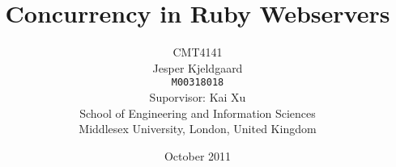 \title{Concurrency in Ruby Webservers}
\author{CMT4141\\
Jesper Kjeldgaard\\
\small \texttt{M00318018}\\
\small Suporvisor: Kai Xu\\
\small School of Engineering and Information Sciences\\[-0.8ex]
\small Middlesex University, London, United Kingdom\\
}
\date{October 2011}
\maketitle
